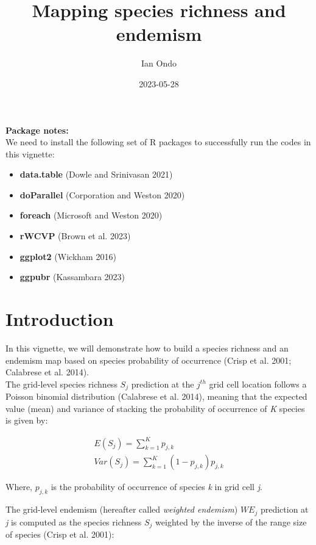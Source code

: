\documentclass[
]{article}
\title{Mapping species richness and endemism}
\author{Ian Ondo}
\date{2023-05-28}
\providecommand{\tightlist}{%
  \setlength{\itemsep}{0pt}\setlength{\parskip}{0pt}}
\begin{document}
\maketitle

{
\setcounter{tocdepth}{2}
\tableofcontents
}
\begin{warningbox}

\textbf{Package notes:}\\
We need to install the following set of R packages to successfully run
the codes in this vignette:

\begin{itemize}
\tightlist
\item
  \textbf{data.table} (Dowle and Srinivasan 2021)
\item
  \textbf{doParallel} (Corporation and Weston 2020)
\item
  \textbf{foreach} (Microsoft and Weston 2020)
\item
  \textbf{rWCVP} (Brown et al. 2023)
\item
  \textbf{ggplot2} (Wickham 2016)
\item
  \textbf{ggpubr} (Kassambara 2023)
\end{itemize}

\end{warningbox}

\hypertarget{introduction}{%
\section{Introduction}\label{introduction}}

In this vignette, we will demonstrate how to build a species richness
and an endemism map based on species probability of occurrence (Crisp et
al. 2001; Calabrese et al. 2014).\\
The grid-level species richness \(S_j\) prediction at the \(j^{th}\)
grid cell location follows a Poisson binomial distribution (Calabrese et
al. 2014), meaning that the expected value (mean) and variance of
stacking the probability of occurrence of \emph{K} species is given by:

\begin{gather}
\tag{1}
E(S_j) = \sum_{k=1}^Kp_{j,k}
\\
\tag{2}
Var(S_j) = \sum_{k=1}^K(1-p_{j,k})p_{j,k}
\end{gather}

Where, \(p_{j,k}\) is the probability of occurrence of species \emph{k}
in grid cell \emph{j}.

The grid-level endemism (hereafter called \emph{weighted endemism})
\(WE_j\) prediction at \emph{j} is computed as the species richness
\(S_j\) weighted by the inverse of the range size of species (Crisp et
al. 2001):
\end{document}
